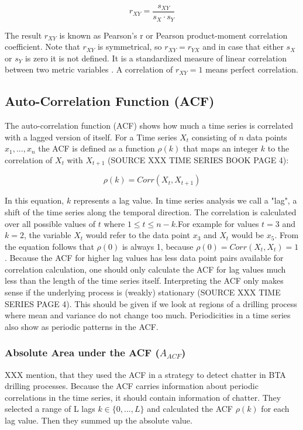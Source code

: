 \documentclass[12 pt]{scrartcl}
\begin{document}
\[ r_{XY} =  \frac{s_{XY}}{s_X \cdot s_Y} \]

The result $r_{XY}$ is known as Pearson's r or Pearson product-moment correlation coefficient. Note that $r_{XY}$ is symmetrical, so $r_{XY} = r_{YX}$ and in case that either $s_X$ or $s_Y$ is zero it is not defined. It is a standardized measure of linear correlation between two metric variables \citep[p.~538]{eid2017statistik}. A correlation of $r_{XY} = 1$ means perfect correlation.


\subsection{Auto-Correlation Function (ACF)}

The auto-correlation function (ACF) shows how much a time series is correlated with a lagged version of itself. For a Time series $X_t$ consisting of $n$ data points $x_1, ..., x_n$ the ACF is defined as a function $\rho(k)$ that maps an integer $k$ to the correlation of $X_t$ with $X_{t+1}$ (SOURCE XXX TIME SERIES BOOK PAGE 4):

\[ \rho(k) = Corr(X_t, X_{t+1}) \]

In this equation, $k$ represents a lag value. In time series analysis we call a "lag", a shift of the time series along the temporal direction. The correlation is calculated over all possible values of $t$ where $1 \le t \le n - k$.For example for values $t = 3$ and $k = 2$, the variable $X_t$ would refer to the data point $x_3$ and $X_t$ would be $x_5$. From the equation follows that $\rho(0)$ is always 1, because $\rho(0) = Corr(X_t, X_t) = 1$. Because the ACF for higher lag values has less data point pairs available for correlation calculation, one should only calculate the ACF for lag values much less than the length of the time series itself.
Interpreting the ACF only makes sense if the underlying process is (weakly) stationary (SOURCE XXX TIME SERIES PAGE 4). This should be given if we look at regions of a drilling process where mean and variance do not change too much. Periodicities in a time series also show as periodic patterns in the ACF.


\subsubsection{Absolute Area under the ACF ($A_{ACF}$)}

XXX mention, that they used the ACF in a strategy to detect chatter in BTA drilling processes. Because the ACF carries information about periodic correlations in the time series, it should contain information of chatter. They selected a range of L lags $k \in \{0, ..., L\}$ and calculated the ACF $\rho(k)$ for each lag value. Then they summed up the absolute value.
\end{document}
